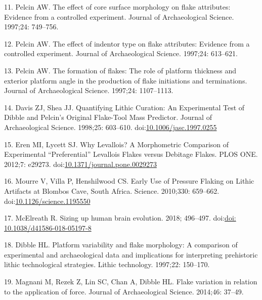 \documentclass[10pt,letterpaper]{article}
\newenvironment{cslreferences}%
  {}%
  {\par}
\begin{document}
\begin{cslreferences}
\leavevmode\hypertarget{ref-pelcin_effect_1997}{}%
11. Pelcin AW. The effect of core surface morphology on flake
attributes: Evidence from a controlled experiment. Journal of
Archaeological Science. 1997;24: 749--756.

\leavevmode\hypertarget{ref-pelcin_effect_1997-1}{}%
12. Pelcin AW. The effect of indentor type on flake attributes: Evidence
from a controlled experiment. Journal of Archaeological Science.
1997;24: 613--621.

\leavevmode\hypertarget{ref-pelcin_formation_1997}{}%
13. Pelcin AW. The formation of flakes: The role of platform thickness
and exterior platform angle in the production of flake initiations and
terminations. Journal of Archaeological Science. 1997;24: 1107--1113.

\leavevmode\hypertarget{ref-davis_quantifying_1998}{}%
14. Davis ZJ, Shea JJ. Quantifying Lithic Curation: An Experimental Test
of Dibble and Pelcin's Original Flake-Tool Mass Predictor. Journal of
Archaeological Science. 1998;25: 603--610.
doi:\href{https://doi.org/10.1006/jasc.1997.0255}{10.1006/jasc.1997.0255}

\leavevmode\hypertarget{ref-eren_why_2012}{}%
15. Eren MI, Lycett SJ. Why Levallois? A Morphometric Comparison of
Experimental ``Preferential'' Levallois Flakes versus Debitage Flakes.
PLOS ONE. 2012;7: e29273.
doi:\href{https://doi.org/10.1371/journal.pone.0029273}{10.1371/journal.pone.0029273}

\leavevmode\hypertarget{ref-mourre_early_2010}{}%
16. Mourre V, Villa P, Henshilwood CS. Early Use of Pressure Flaking on
Lithic Artifacts at Blombos Cave, South Africa. Science. 2010;330:
659--662.
doi:\href{https://doi.org/10.1126/science.1195550}{10.1126/science.1195550}

\leavevmode\hypertarget{ref-mcelreath_sizing_2018}{}%
17. McElreath R. Sizing up human brain evolution. 2018; 496--497.
doi:\href{https://doi.org/doi:\%2010.1038/d41586-018-05197-8}{doi: 10.1038/d41586-018-05197-8}

\leavevmode\hypertarget{ref-dibble_platform_1997}{}%
18. Dibble HL. Platform variability and flake morphology: A comparison
of experimental and archaeological data and implications for
interpreting prehistoric lithic technological strategies. Lithic
technology. 1997;22: 150--170.

\leavevmode\hypertarget{ref-magnani_flake_2014-1}{}%
19. Magnani M, Rezek Z, Lin SC, Chan A, Dibble HL. Flake variation in
relation to the application of force. Journal of Archaeological Science.
2014;46: 37--49.


\end{cslreferences}
\end{document}
